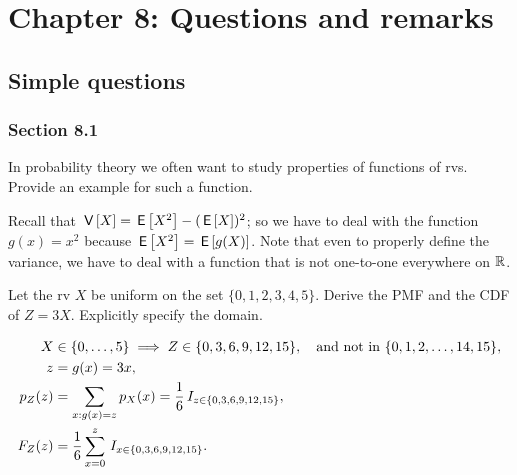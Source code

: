 

\chapter{Chapter 8: Questions and remarks}

\section{Simple questions}





\subsection*{Section 8.1}


\begin{exercise}
In probability theory we often want to study properties of  functions of rvs. Provide an example for such  a function.
\begin{solution}
Recall that $\,\mathsf{V}\left[X\right] = \,\mathsf{E}\left[X^2\right]-(\,\mathsf{E}\left[X\right])^2$; so we have to deal with the function $g(x) = x^{2}$ because $\,\mathsf{E}\left[X^2\right]= \,\mathsf{E}\left[g(X)\right]$.
Note that even to properly define the variance, we have to deal with a function that is not one-to-one everywhere on $\mathbb{R}$.
\end{solution}
\end{exercise}


\begin{exercise}
Let the rv $X$ be uniform on the set $\{0, 1, 2, 3, 4, 5\}$. Derive the PMF and the CDF of $Z=3X$. Explicitly specify the domain.
\begin{solution}
  \begin{align}
    \label{eq:17}
    X &\in \{0, \ldots, 5\} \implies Z \in \{0, 3, 6, 9, 12, 15\}, \quad \text{and not in } \{0, 1, 2, \ldots, 14, 15\},\\
z &= g(x) = 3x,\\
p_{Z}(z) &= \sum_{x: g(x) =z } p_{X}(x) = \frac{1}{6} \,I_{z \in \{0, 3, 6, 9, 12, 15\}}, \\
F_{Z}(z) &=\frac{1}{6} \sum_{x=0}^{z} \,I_{x \in \{0, 3, 6, 9, 12, 15\}}.
  \end{align}
\end{solution}
\end{exercise}



